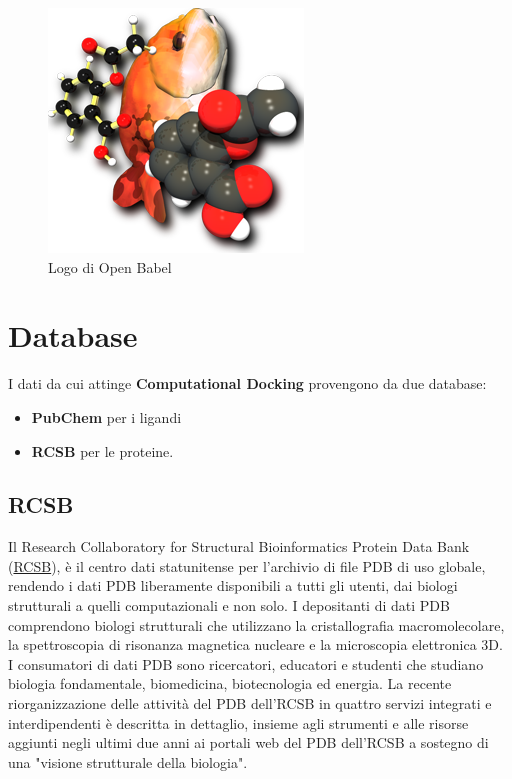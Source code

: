 \begin{figure}[H]
    \centering
    \includegraphics[scale=0.6]{immagini/capitolo2/openBabelLogo.png}
    \caption{Logo di Open Babel}
    \label{fig:open babel logo}
\end{figure}

\section{Database}
I dati da cui attinge \textbf{Computational Docking} provengono da due database: 

\begin{itemize}
    \item \textbf{PubChem} per i ligandi
    \item \textbf{RCSB} per le proteine.
\end{itemize}

\subsection{RCSB}
Il Research Collaboratory for Structural Bioinformatics Protein Data Bank (\href{https://www.rcsb.org/search}{RCSB}), è il centro dati statunitense per l'archivio di file PDB di uso globale, rendendo i dati PDB liberamente disponibili a tutti gli utenti, dai biologi strutturali a quelli computazionali e non solo\cite{10.1093/nar/gkw1000}.\newline
I depositanti di dati PDB comprendono biologi strutturali che utilizzano la cristallografia macromolecolare, la spettroscopia di risonanza magnetica nucleare e la microscopia elettronica 3D. I consumatori di dati PDB sono ricercatori, educatori e studenti che studiano biologia fondamentale, biomedicina, biotecnologia ed energia. La recente riorganizzazione delle attività del PDB dell'RCSB in quattro servizi integrati e interdipendenti è descritta in dettaglio, insieme agli strumenti e alle risorse aggiunti negli ultimi due anni ai portali web del PDB dell'RCSB a sostegno di una "visione strutturale della biologia"\cite{10.1093/nar/gky1004}.


